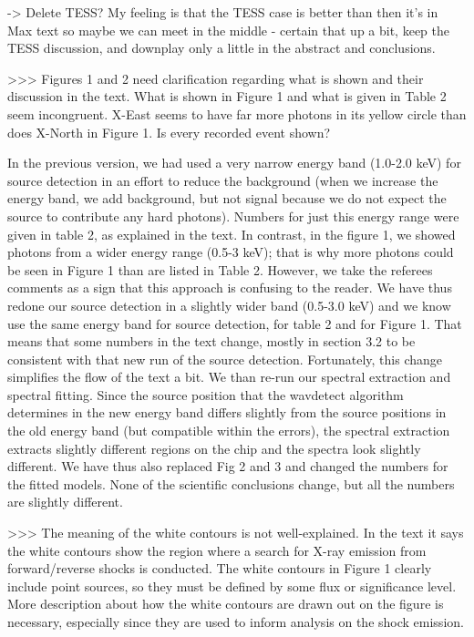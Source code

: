 -> Delete TESS? My feeling is that the TESS case is better than then it's in Max text so maybe we can meet in the middle - certain that up a bit, keep the TESS discussion, and downplay only a little in the abstract and conclusions.


>>> Figures 1 and 2 need clarification regarding what is shown and their discussion in the text. What is shown in Figure 1 and what is given in Table 2 seem incongruent. X-East seems to have far more photons in its yellow circle than does X-North in Figure 1. Is every recorded event shown?

In the previous version, we had used a very narrow energy band (1.0-2.0 keV) for source detection in an effort to reduce the background (when we increase the energy band, we add background, but not signal because we do not expect the source to contribute any hard photons). Numbers for just this energy range were given in table 2, as explained in the text. In contrast, in the figure 1, we showed photons from a wider energy range (0.5-3 keV); that is why more photons could be seen in Figure 1 than are listed in Table 2.
However, we take the referees comments as a sign that this approach is confusing to the reader. We have thus redone our source detection in a slightly wider band (0.5-3.0 keV) and we know use the same energy band for source detection, for table 2 and for Figure 1. That means that some numbers in the text change, mostly in section 3.2 to be consistent with that new run of the source detection. Fortunately, this change simplifies the flow of the text a bit. 
We than re-run our spectral extraction and spectral fitting. Since the source position that the wavdetect algorithm determines in the new energy band differs slightly from the source positions in the old energy band (but compatible within the errors), the spectral extraction extracts slightly different regions on the chip and the spectra look slightly different. We have thus also replaced Fig 2 and 3 and changed the numbers for the fitted models. 
None of the scientific conclusions change, but all the numbers are slightly different.

>>> The meaning of the white contours is not well-explained. In the text it says the white contours show the region where a search for X-ray emission from forward/reverse shocks is conducted. The white contours in Figure 1 clearly include point sources, so they must be defined by some flux or significance level. More description about how the white contours are drawn out on the figure is necessary, especially since they are used to inform analysis on the shock emission.


